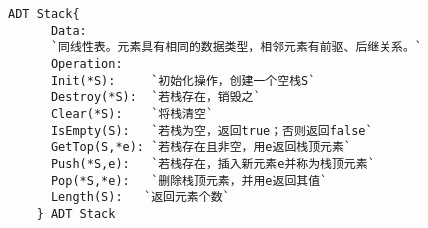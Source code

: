 \begin{frame}\ft{\subsecname}

  

\end{frame}


\begin{frame}[fragile]\ft{\subsecname}   
\begin{lstlisting}[mathescape=true]
    ADT Stack{
      Data:
      `同线性表。元素具有相同的数据类型，相邻元素有前驱、后继关系。`
      Operation:
      Init(*S):     `初始化操作，创建一个空栈S`
      Destroy(*S):  `若栈存在，销毁之`
      Clear(*S):    `将栈清空`
      IsEmpty(S):   `若栈为空，返回true；否则返回false`
      GetTop(S,*e): `若栈存在且非空，用e返回栈顶元素`
      Push(*S,e):   `若栈存在，插入新元素e并称为栈顶元素`
      Pop(*S,*e):   `删除栈顶元素，并用e返回其值`
      Length(S):   `返回元素个数`
    } ADT Stack
  \end{lstlisting}
\end{frame}
